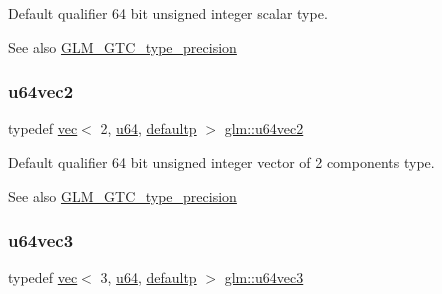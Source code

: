 Default qualifier 64 bit unsigned integer scalar type. \begin{DoxySeeAlso}{See also}
\mbox{\hyperlink{group__gtc__type__precision}{G\+L\+M\+\_\+\+G\+T\+C\+\_\+type\+\_\+precision}} 
\end{DoxySeeAlso}
\mbox{\label{group__gtc__type__precision_ga989179a9ae798526e8bac59fb21678b7}} 
\subsubsection{\texorpdfstring{u64vec2}{u64vec2}}
{\footnotesize\ttfamily typedef \mbox{\hyperlink{structglm_1_1vec}{vec}}$<$ 2, \mbox{\hyperlink{group__gtc__type__precision_ga71cedd4972f9cb1a5e14dfe5ab83ecd7}{u64}}, \mbox{\hyperlink{namespaceglm_a36ed105b07c7746804d7fdc7cc90ff25a9d21ccd8b5a009ec7eb7677befc3bf51}{defaultp}} $>$ \mbox{\hyperlink{group__gtc__type__precision_ga989179a9ae798526e8bac59fb21678b7}{glm\+::u64vec2}}}

Default qualifier 64 bit unsigned integer vector of 2 components type. \begin{DoxySeeAlso}{See also}
\mbox{\hyperlink{group__gtc__type__precision}{G\+L\+M\+\_\+\+G\+T\+C\+\_\+type\+\_\+precision}} 
\end{DoxySeeAlso}
\mbox{\label{group__gtc__type__precision_ga2d3e22f2413f79536d5cf3561949cd53}} 
\subsubsection{\texorpdfstring{u64vec3}{u64vec3}}
{\footnotesize\ttfamily typedef \mbox{\hyperlink{structglm_1_1vec}{vec}}$<$ 3, \mbox{\hyperlink{group__gtc__type__precision_ga71cedd4972f9cb1a5e14dfe5ab83ecd7}{u64}}, \mbox{\hyperlink{namespaceglm_a36ed105b07c7746804d7fdc7cc90ff25a9d21ccd8b5a009ec7eb7677befc3bf51}{defaultp}} $>$ \mbox{\hyperlink{group__gtc__type__precision_ga2d3e22f2413f79536d5cf3561949cd53}{glm\+::u64vec3}}}

